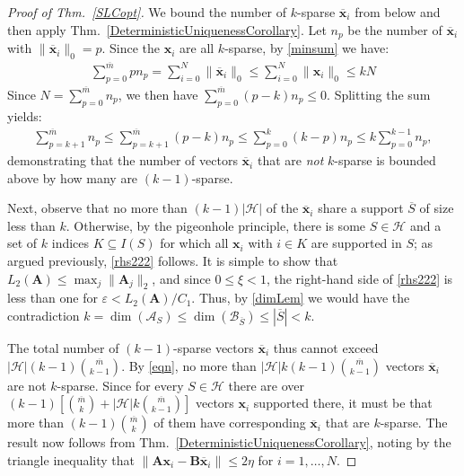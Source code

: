 \documentclass[journal, twocolumn]{IEEEtran}
\begin{document}
\begin{proof}[Proof of Thm.~\ref{SLCopt}]
We bound the number of $k$-sparse $\mathbf{\overline x}_i$ from below and then apply Thm.~\ref{DeterministicUniquenessCorollary}. 
Let $n_p$ be the number of $\mathbf{\overline x}_i$ with $\|\mathbf{\overline x}_i\|_0 = p$.
Since the $\mathbf{x}_i$ are all $k$-sparse, by \eqref{minsum} we have:
\begin{align*}
\sum_{p=0}^{\overline m} p n_p =  \sum_{i=0}^N \|\mathbf{\overline x}_i\|_0
\leq \sum_{i=0}^N \|\mathbf{x}_i\|_0 
\leq kN
\end{align*}
Since $N = \sum_{p = 0}^{\overline m} n_p$, we then have $\sum_{p = 0}^{\overline m} (p-k) n_p \leq 0$. Splitting the sum yields:
\begin{align}\label{eqn}
\sum_{p = k+1}^{\overline m} n_p \leq \sum_{p = k+1}^{\overline m} (p-k) n_p \leq \sum_{p = 0}^k (k-p)n_p \leq k \sum_{p = 0}^{k-1} n_p,
\end{align}
%
demonstrating that the number of vectors $\mathbf{\overline x}_i$ that are \emph{not} $k$-sparse is bounded above by how many are $(k-1)$-sparse. 

Next, observe that no more than $(k-1)|\mathcal{H}|$ of the $\mathbf{\overline x}_i$ share a support $\overline S$ of size less than $k$. Otherwise, by the pigeonhole principle, there is some $S \in \mathcal{H}$ and a set of $k$ indices $K \subseteq I(S)$ for which all $\mathbf{x}_i$ with $i \in K$ are supported in $S$; as argued previously, \eqref{rhs222} follows. It is simple to show that $L_2(\mathbf{A}) \leq \max_j\|\mathbf{A}_j\|_2$, and since $0 \leq \xi < 1$, the right-hand side of \eqref{rhs222} is less than one for $\varepsilon < L_2(\mathbf{A})/C_1$. Thus, by \eqref{dimLem} we would have the contradiction $k = \dim(\bm{\mathcal{A}}_S) \leq \dim(\bm{\mathcal{B}}_{\overline S}) \leq |\overline S| < k.$ 

The total number of $(k-1)$-sparse vectors $\mathbf{\overline x}_i$ thus cannot exceed $|\mathcal{H}|(k-1){ \overline m \choose k-1}$. By \eqref{eqn}, no more than $|\mathcal{H}|k(k-1){ \overline m \choose k-1}$ vectors $\mathbf{\overline x}_i$ are not $k$-sparse. Since for every $S \in \mathcal{H}$ there are over $(k-1)\left[ {\overline m \choose k} + |\mathcal{H}|k{ \overline m \choose k-1} \right]$ vectors $\mathbf{x}_i$ supported there, it must be that more than $(k-1){\overline m \choose k}$ of them have corresponding $\mathbf{\overline x}_i$ that are $k$-sparse. The result now follows from Thm.~\ref{DeterministicUniquenessCorollary}, noting by the triangle inequality that $\|\mathbf{A}\mathbf{x}_i - \mathbf{B}\mathbf{\overline x}_i\| \leq 2\eta$ for $i = 1, \ldots, N$.
\end{proof}
\end{document}
